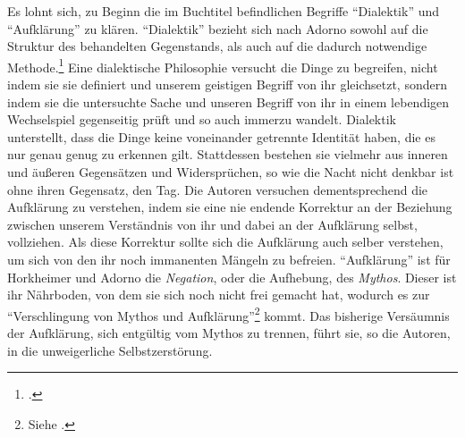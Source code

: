 \documentclass[a4paper, 12pt]{article}
\begin{document}
\begin{onehalfspace}
Es lohnt sich, zu Beginn die im Buchtitel befindlichen Begriffe "`Dialektik"' und "`Aufklärung"' zu klären. "`Dialektik"' bezieht sich nach Adorno sowohl auf die Struktur des behandelten Gegenstands, als auch auf die dadurch notwendige Methode.\footnote{\Cite[Vgl.][S. 9]{dialektik}.} Eine dialektische Philosophie versucht die Dinge zu begreifen, nicht indem sie sie definiert und unserem geistigen Begriff von ihr gleichsetzt, sondern indem sie die untersuchte Sache und unseren Begriff von ihr in einem lebendigen Wechselspiel gegenseitig prüft und so auch immerzu wandelt. Dialektik unterstellt, dass die Dinge keine voneinander getrennte Identität haben, die es nur genau genug zu erkennen gilt. Stattdessen bestehen sie vielmehr aus inneren und äußeren Gegensätzen und Widersprüchen, so wie die Nacht nicht denkbar ist ohne ihren Gegensatz, den Tag. Die Autoren versuchen dementsprechend die Aufklärung zu verstehen, indem sie eine nie endende Korrektur an der Beziehung zwischen unserem Verständnis von ihr und dabei an der Aufklärung selbst, vollziehen. Als diese Korrektur sollte sich die Aufklärung auch selber verstehen, um sich von den ihr noch immanenten Mängeln zu befreien. "`Aufklärung"' ist für Horkheimer und Adorno die \emph{Negation}, oder die Aufhebung, des \emph{Mythos}. Dieser ist ihr Nährboden, von dem sie sich noch nicht frei gemacht hat, wodurch es zur "`Verschlingung von Mythos und Aufklärung"'\footnote{Siehe \Cite{habermas}.} kommt. Das bisherige Versäumnis der Aufklärung, sich entgültig vom Mythos zu trennen, führt sie, so die Autoren, in die unweigerliche Selbstzerstörung.


\end{onehalfspace}
\end{document}
